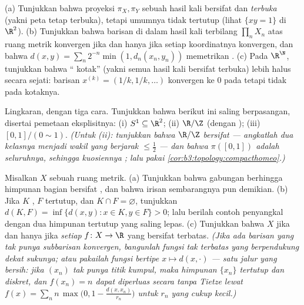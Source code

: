 \begin{exercise}[$\star\star$]\label{exo:b3:topology:4}
(a) Tunjukkan bahwa proyeksi $\pi_X, \pi_Y$ sebuah hasil kali bersifat
 dan \emph{terbuka} (yakni peta  tetap terbuka), tetapi umumnya tidak
tertutup (lihat $\{xy = 1\}$ di $\R^2$).
(b) Tunjukkan bahwa barisan di dalam hasil kali terbilang $\prod_n X_n$ atas
ruang metrik konvergen jika dan hanya jika setiap koordinatnya konvergen, dan bahwa
$d(x, y) = \sum_n 2^{-n}\min(1, d_n(x_n, y_n))$ memetrikan
.
(c) Pada $\R^\N$, tunjukkan bahwa `` kotak'' (yakni semua hasil kali
 bersifat terbuka) lebih halus secara sejati: barisan
$x^{(k)} = (1/k, 1/k, \dots)$ konvergen ke $0$ pada  tetapi tidak pada  kotaknya.
\end{exercise}

\begin{exercise}[$\star\star$]\label{exo:b3:topology:5}
Lingkaran, dengan tiga cara. Tunjukkan bahwa berikut ini saling
 berpasangan, disertai pemetaan eksplisitnya: (i) $S^1 \subseteq \R^2$;
(ii) $\R/\Z$ (dengan ); (iii) $[0,1]/(0 \sim 1)$.
\emph{(Untuk (ii): tunjukkan bahwa $\R/\Z$ bersifat  --- angkatlah dua kelasnya
menjadi wakil yang berjarak $\leq \frac12$ --- dan bahwa
$\pi([0,1])$ adalah seluruhnya, sehingga kuosiennya ; lalu pakai
\cref{cor:b3:topology:compacthomeo}.)}
\end{exercise}

\begin{exercise}[$\star\star$]\label{exo:b3:topology:6}
Misalkan $X$ sebuah ruang metrik.
(a) Tunjukkan bahwa gabungan berhingga himpunan bagian  bersifat , dan
bahwa irisan sembarangnya pun demikian.
(b) Jika $K$ , $F$ tertutup, dan $K \cap F = \varnothing$,
tunjukkan $d(K, F) = \inf\{d(x,y) : x \in K, y \in F\} > 0$; lalu berilah
contoh penyangkal dengan dua himpunan tertutup yang saling lepas.
(c) Tunjukkan bahwa $X$  jika dan hanya jika \emph{setiap} $f
\colon X \to \R$ yang  bersifat terbatas. \emph{(Jika ada barisan yang tak punya
subbarisan konvergen, bangunlah fungsi  tak terbatas yang
berpendukung dekat sukunya; atau pakailah fungsi bertipe $x \mapsto
d(x, \cdot)$ --- satu jalur yang bersih: jika $(x_n)$ tak punya
titik kumpul, maka himpunan $\{x_n\}$ tertutup dan diskret, dan
$f(x_n) = n$ dapat diperluas secara  tanpa Tietze lewat
$f(x) = \sum_n n\,\max\bigl(0, 1 - \frac{d(x, x_n)}{r_n}\bigr)$
untuk $r_n$ yang cukup kecil.)}
\end{exercise}

